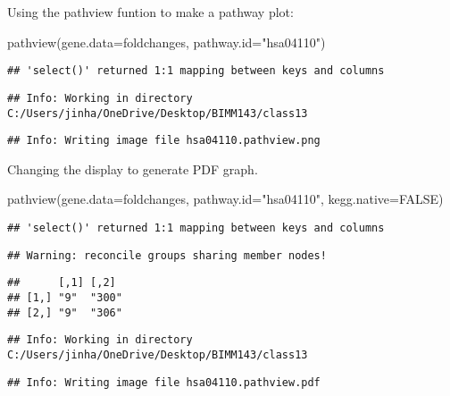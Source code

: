 \documentclass[
]{article}
\newenvironment{Shaded}{\begin{snugshade}}{\end{snugshade}}
\newcommand{\AttributeTok}[1]{\textcolor[rgb]{0.77,0.63,0.00}{#1}}
\newcommand{\ConstantTok}[1]{\textcolor[rgb]{0.00,0.00,0.00}{#1}}
\newcommand{\FunctionTok}[1]{\textcolor[rgb]{0.00,0.00,0.00}{#1}}
\newcommand{\NormalTok}[1]{#1}
\newcommand{\StringTok}[1]{\textcolor[rgb]{0.31,0.60,0.02}{#1}}
\begin{document}
Using the pathview funtion to make a pathway plot:

\begin{Shaded}
\begin{Highlighting}[]
\FunctionTok{pathview}\NormalTok{(}\AttributeTok{gene.data=}\NormalTok{foldchanges, }\AttributeTok{pathway.id=}\StringTok{"hsa04110"}\NormalTok{)}
\end{Highlighting}
\end{Shaded}

\begin{verbatim}
## 'select()' returned 1:1 mapping between keys and columns
\end{verbatim}

\begin{verbatim}
## Info: Working in directory C:/Users/jinha/OneDrive/Desktop/BIMM143/class13
\end{verbatim}

\begin{verbatim}
## Info: Writing image file hsa04110.pathview.png
\end{verbatim}

Changing the display to generate PDF graph.

\begin{Shaded}
\begin{Highlighting}[]
\FunctionTok{pathview}\NormalTok{(}\AttributeTok{gene.data=}\NormalTok{foldchanges, }\AttributeTok{pathway.id=}\StringTok{"hsa04110"}\NormalTok{, }\AttributeTok{kegg.native=}\ConstantTok{FALSE}\NormalTok{)}
\end{Highlighting}
\end{Shaded}

\begin{verbatim}
## 'select()' returned 1:1 mapping between keys and columns
\end{verbatim}

\begin{verbatim}
## Warning: reconcile groups sharing member nodes!
\end{verbatim}

\begin{verbatim}
##      [,1] [,2] 
## [1,] "9"  "300"
## [2,] "9"  "306"
\end{verbatim}

\begin{verbatim}
## Info: Working in directory C:/Users/jinha/OneDrive/Desktop/BIMM143/class13
\end{verbatim}

\begin{verbatim}
## Info: Writing image file hsa04110.pathview.pdf
\end{verbatim}
\end{document}
